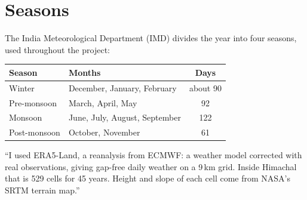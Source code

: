 \section{Seasons}
The India Meteorological Department (IMD) divides the year into four seasons, used throughout the project:
\begin{center}
\begin{tabular}{llc}
\toprule
\textbf{Season} & \textbf{Months} & \textbf{Days}\\
\midrule
Winter & December, January, February & about 90\\
Pre-monsoon & March, April, May & 92\\
Monsoon & June, July, August, September & 122\\
Post-monsoon & October, November & 61\\
\bottomrule
\end{tabular}
\end{center}

\begin{sayit}
``I used ERA5-Land, a reanalysis from ECMWF: a weather model corrected with real observations, giving gap-free daily
weather on a 9\,km grid. Inside Himachal that is 529 cells for 45 years. Height and slope of each cell come from NASA's
SRTM terrain map.''
\end{sayit}
